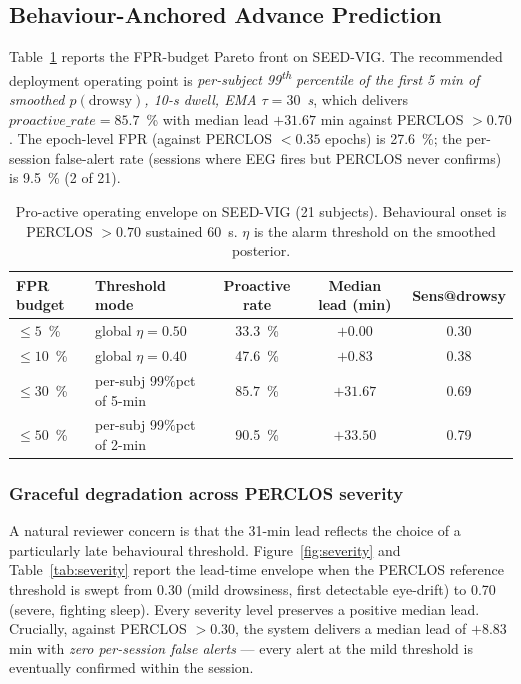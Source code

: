 \documentclass[journal]{IEEEtran}
\DeclareRobustCommand{\add}[1]{#1}                         %
\DeclareRobustCommand{\del}[1]{}                           %
\DeclareRobustCommand{\add}[1]{\hl{#1}}
\DeclareRobustCommand{\del}[1]{{\color{delred}\sout{#1}}\,}
\DeclareRobustCommand{\del}[1]{}                         %
\DeclareRobustCommand{\chg}[2]{\del{#1}\add{#2}}
\begin{document}
\subsection{\chg{Pro-Active Track}{Behaviour-Anchored Advance Prediction}}
\label{sec:proactive}
Table~\ref{tab:proactive} reports the FPR-budget Pareto front on SEED-VIG. The recommended deployment operating point is \emph{per-subject 99\textsuperscript{th} percentile of the first 5 min of smoothed \(p(\mathrm{drowsy})\), 10-s dwell, EMA \(\tau = 30\)~s}, which delivers \(\mathit{proactive\_rate} = 85.7\)~\% with median lead \(+31.67\) min against PERCLOS \(>0.70\). The epoch-level FPR (against PERCLOS \(<0.35\) epochs) is 27.6~\%; the per-session false-alert rate (sessions where EEG fires but PERCLOS never confirms) is 9.5~\% (2 of 21).

\begin{table}[t]
\caption{Pro-active operating envelope on SEED-VIG (21 subjects). Behavioural onset is PERCLOS \(>0.70\) sustained 60~s. \(\eta\) is the alarm threshold on the smoothed posterior.}
\label{tab:proactive}
\centering
\small
\setlength{\tabcolsep}{3pt}
\begin{tabular}{l l c c c}
\toprule
FPR budget & Threshold mode & Proactive rate & Median lead (min) & Sens@drowsy \\
\midrule
\(\leq 5\)~\%  & global \(\eta=0.50\)                & 33.3~\% & \(+0.00\)  & 0.30 \\
\(\leq 10\)~\% & global \(\eta=0.40\)                & 47.6~\% & \(+0.83\)  & 0.38 \\
\(\leq 30\)~\% & per-subj 99\(\%\)pct of 5-min       & \(\mathbf{85.7}\)~\% & \(\mathbf{+31.67}\) & 0.69 \\
\(\leq 50\)~\% & per-subj 99\(\%\)pct of 2-min       & 90.5~\% & \(+33.50\) & 0.79 \\
\bottomrule
\end{tabular}
\end{table}

\subsubsection{Graceful degradation across PERCLOS severity}
\label{sec:severity}
A natural reviewer concern is that the 31-min lead reflects the choice of a particularly late behavioural threshold. Figure~\ref{fig:severity} and Table~\ref{tab:severity} report the lead-time envelope when the PERCLOS reference threshold is swept from 0.30 (mild drowsiness, first detectable eye-drift) to 0.70 (severe, fighting sleep). Every severity level preserves a positive median lead. Crucially, against PERCLOS \(>0.30\), the system delivers a median lead of \(+8.83\) min with \emph{zero per-session false alerts} --- every alert at the mild threshold is eventually confirmed within the session.
\end{document}
